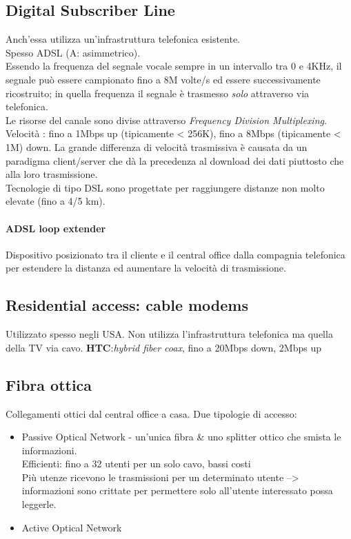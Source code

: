 \subsection{Digital Subscriber Line}
Anch'essa utilizza un'infrastruttura telefonica esistente.\\Spesso ADSL (A: asimmetrico).\\
Essendo la frequenza del segnale vocale sempre in un intervallo tra 0 e 4KHz, il segnale può essere campionato fino a 8M volte/s ed essere successivamente ricostruito; in quella frequenza il segnale è trasmesso \textit{solo} attraverso via telefonica.\\
Le risorse del canale sono divise attraverso \textit{Frequency Division Multiplexing}.\\
Velocità : fino a 1Mbps up (tipicamente < 256K), fino a 8Mbps (tipicamente < 1M) down. La grande differenza di velocità trasmissiva è causata da un paradigma client/server che dà la precedenza al download dei dati piuttosto che alla loro trasmissione.
\\
Tecnologie di tipo DSL sono progettate per raggiungere distanze non molto elevate (fino a 4/5 km).
\\
\paragraph{ADSL loop extender} 
Dispositivo posizionato tra il cliente e il central office dalla compagnia telefonica per estendere la distanza ed aumentare la velocità di trasmissione.
\\
\subsection{Residential access: cable modems}
Utilizzato spesso negli USA.
Non utilizza l'infrastruttura telefonica ma quella della TV via cavo.
\textbf{HTC}:\textit{hybrid fiber coax}, fino a 20Mbps down, 2Mbps up
	\subsection{Fibra ottica}
	Collegamenti ottici dal central office a casa.
	Due tipologie di accesso:
	\begin{itemize}
		\item Passive Optical Network - un'unica fibra \& uno splitter ottico che smista le informazioni.\\
		Efficienti: fino a 32 utenti per un solo cavo, bassi costi
		\\Più utenze ricevono le trasmissioni per un determinato utente --> informazioni sono crittate per permettere solo all'utente interessato possa leggerle.\\%
		
		\item Active Optical Network
	\end{itemize}
